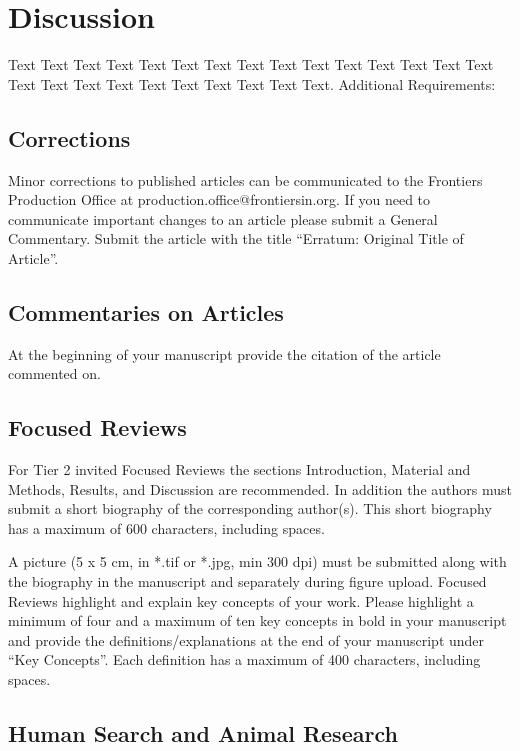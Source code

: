 \documentclass{frontiersMED} %
\begin{document}
\section{Discussion}

Text Text Text Text Text Text  Text Text Text Text Text Text Text Text Text  Text Text Text Text Text Text Text Text Text Text.
Additional Requirements:
\subsection{Corrections}

Minor corrections to published articles can be communicated to the Frontiers Production Office at production.office@frontiersin.org. If you need to communicate important changes to an article please submit a General Commentary. Submit the article with the title “Erratum: Original Title of Article”.

\subsection{Commentaries on Articles}

At the beginning of your manuscript provide the citation of the article commented on.

\subsection{Focused Reviews}

For Tier 2 invited Focused Reviews the sections Introduction, Material and Methods, Results, and Discussion are recommended. In addition the authors must submit a short biography of the corresponding author(s). This short biography has a maximum of 600 characters, including spaces.

A picture (5 x 5 cm, in *.tif or *.jpg, min 300 dpi) must be submitted along with the biography in the manuscript and separately during figure upload.
Focused Reviews highlight and explain key concepts of your work. Please highlight a minimum of four and a maximum of ten key concepts in bold in your manuscript and provide the definitions/explanations at the end of your manuscript under “Key Concepts”. Each definition has a maximum of 400 characters, including spaces.

\subsection{Human Search and Animal Research}
\end{document}

